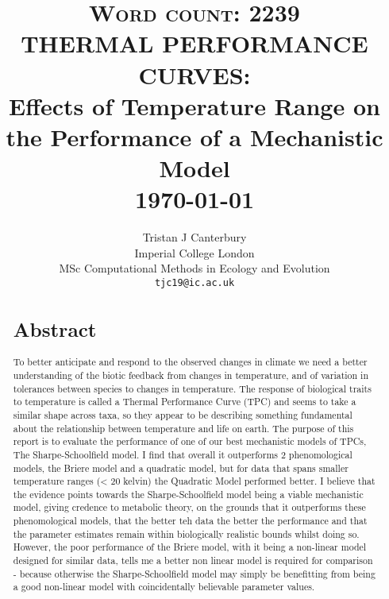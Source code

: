 \documentclass[fontsize=11pt]{scrartcl}\usepackage[]{graphicx}\usepackage[]{color}
\title{	\normalsize \textsc{Word count: 2239} 	%
			\HRule{0.5pt} \\						%
			\LARGE \textbf{\uppercase{Thermal Performance Curves:\\} 
                      {Effects of Temperature Range on the Performance of a Mechanistic Model}}	%
			\HRule{2pt} \\ [0.5cm]		%
			\normalsize \today			%
		}
\author{
		Tristan J Canterbury\\	
		Imperial College London\\	
		MSc Computational Methods in Ecology and Evolution\\
        \texttt{tjc19@ic.ac.uk} \\
}
\makeatletter
\def\printtitle{%
    {\centering \@title\par}}
\def\printauthor{%
    {\centering \large \@author}}
\makeatother
\begin{document}
\linenumbers
    \thispagestyle{empty}		%

  \printtitle					%
      \vfill
  \printauthor				%
  \newpage
  \setcounter{page}{1}

  \begin{abstract}
  \section{Abstract} 
  To better anticipate and respond to the observed changes in climate
  we need a better understanding of the biotic feedback from changes in temperature, and of variation
  in tolerances between species to changes in temperature. The response of biological traits to temperature is called a 
  Thermal Performance Curve (TPC) and seems to take a similar shape across taxa, so they appear to be describing something
  fundamental about the relationship between temperature and life on earth.
  The purpose of this report is to evaluate the performance of one of our best mechanistic models of TPCs, The
  Sharpe-Schoolfield model. I find that overall it outperforms 2 phenomological models, the Briere model and a quadratic model, 
  but for data that spans smaller temperature ranges (< 20 kelvin) the Quadratic Model performed better.
  I believe that the evidence points towards the Sharpe-Schoolfield model being a viable mechanistic model, giving credence
  to metabolic theory, on the grounds that it outperforms 
  these phenomological models, that the better teh data the better the performance and that the parameter estimates 
  remain within biologically realistic bounds whilst doing so. 
  However, the poor performance of the Briere model, with it being a non-linear 
  model designed for similar data, tells me a better non linear model is required for comparison - because otherwise 
  the Sharpe-Schoolfield model may simply be benefitting from being a good non-linear model with coincidentally believable 
  parameter values.  

  \end{abstract}
\end{document}
